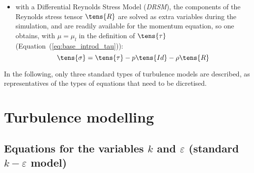 \begin{itemize}
\begin{itemize}
\item with a Differential Reynolds Stress Model (\emph{DRSM}), the
components of the Reynolds stress tensor $\tens{R}$ are solved as extra
variables during the simulation, and are readily available for the momentum
equation, so one obtains, with $\mu =\mu _{l}$ in the definition of $%
\tens{\tau}$ (Equation~(\ref{eq:base_introd_tau})):
\begin{equation}
\tens{\sigma}=\tens{\tau}-p\tens{Id}-\rho \tens{R}
\end{equation}

\end{itemize}
\end{itemize}

In the following, only three standard types of turbulence models are
described, as representatives of the types of equations that need to be
dicretised. 

\section{Turbulence modelling}
\subsection{Equations for the variables $k$ and $\varepsilon$
(standard $k-\varepsilon$ model)}

